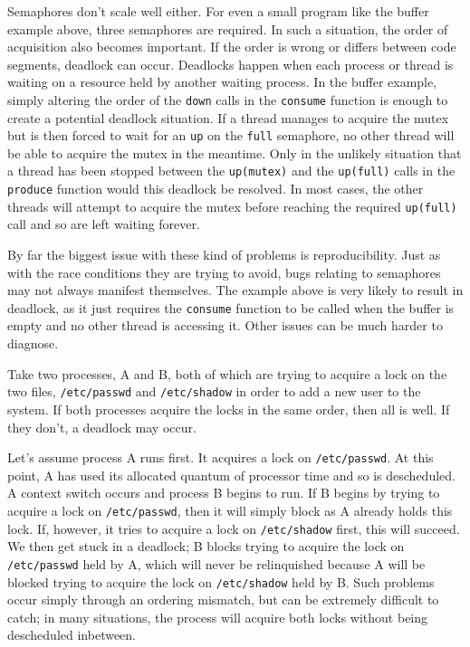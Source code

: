 Semaphores don't scale well either.  For even a small program like the
buffer example above, three semaphores are required.  In such a
situation, the order of acquisition also becomes important.  If the
order is wrong or differs between code segments, deadlock can occur.
Deadlocks happen when each process or thread is waiting on a resource
held by another waiting process.  In the buffer example, simply
altering the order of the \texttt{down} calls in the \texttt{consume}
function is enough to create a potential deadlock situation.  If a
thread manages to acquire the mutex but is then forced to wait for an
\texttt{up} on the \texttt{full} semaphore, no other thread will be able to
acquire the mutex in the meantime.  Only in the unlikely situation
that a thread has been stopped between the \texttt{up(mutex)} and the
\texttt{up(full)} calls in the \texttt{produce} function would this
deadlock be resolved.  In most cases, the other threads will attempt
to acquire the mutex before reaching the required \texttt{up(full)}
call and so are left waiting forever.

By far the biggest issue with these kind of problems is
reproducibility.  Just as with the race conditions they are trying to
avoid, bugs relating to semaphores may not always manifest themselves.
The example above is very likely to result in deadlock, as it just
requires the \texttt{consume} function to be called when the buffer is
empty and no other thread is accessing it.  Other issues can be much
harder to diagnose.

Take two processes, A and B, both of which are trying to acquire a
lock on the two files, \texttt{/etc/passwd} and \texttt{/etc/shadow}
in order to add a new user to the system.  If both processes acquire
the locks in the same order, then all is well.  If they don't, a
deadlock may occur.

Let's assume process A runs first.  It acquires a lock on
\texttt{/etc/passwd}.  At this point, A has used its allocated quantum
of processor time and so is descheduled.  A context switch occurs and
process B begins to run.  If B begins by trying to acquire a lock on
\texttt{/etc/passwd}, then it will simply block as A already holds
this lock.  If, however, it tries to acquire a lock on
\texttt{/etc/shadow} first, this will succeed.  We then get stuck in a
deadlock; B blocks trying to acquire the lock on \texttt{/etc/passwd}
held by A, which will never be relinquished because A will be blocked
trying to acquire the lock on \texttt{/etc/shadow} held by B.  Such
problems occur simply through an ordering mismatch, but can be
extremely difficult to catch; in many situations, the process will
acquire both locks without being descheduled inbetween.

